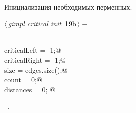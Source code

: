 \documentclass[12pt]{article}
\begin{document}
\paragraph{}
Инициализация необходимых перменных.
\begin{flushleft} \small
\begin{minipage}{\linewidth}\label{scrap32}\raggedright\small
{} $\langle\,${\itshape gimpl critical init}\nobreak\ {\footnotesize {19b}}$\,\rangle\equiv$
\vspace{-1ex}
\begin{list}{}{} \item
\mbox{}\verb@@\\
\mbox{}\verb@int criticalLeft = -1;@\\
\mbox{}\verb@int criticalRight = -1;@\\
\mbox{}\verb@int size = edges.size();@\\
\mbox{}\verb@int count = 0;@\\
\mbox{}\verb@double distances = 0; @\\
\mbox{}\verb@@{\NWsep}
\end{list}
\vspace{-1.5ex}
\footnotesize
\begin{list}{}{\setlength{\itemsep}{-\parsep}\setlength{\itemindent}{-\leftmargin}}
\item \NWtxtMacroRefIn\ .

\item{}
\end{list}
\end{minipage}\vspace{4ex}
\end{flushleft}
\end{document}
